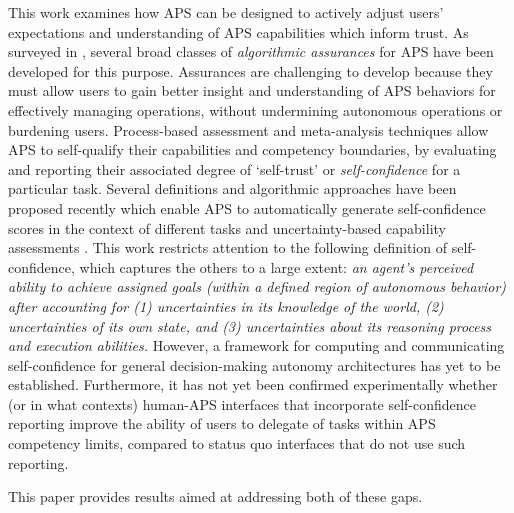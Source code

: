 This work examines how APS can be designed to actively adjust users' expectations and understanding of APS capabilities which inform trust. As surveyed in \cite{Israelsen2017-ym}, several broad classes of \emph{algorithmic assurances} for APS have been developed for this purpose. 
Assurances are challenging to develop because they must allow users to gain better insight and understanding of APS behaviors for effectively managing operations, without undermining autonomous operations or burdening users. 
Process-based assessment and meta-analysis techniques allow APS to self-qualify their capabilities and competency boundaries, by evaluating and reporting their associated degree of `self-trust' or \emph{self-confidence} for a particular task. 
Several definitions and algorithmic approaches have been proposed recently which enable APS to automatically generate self-confidence scores in the context of different tasks and uncertainty-based capability assessments \cite{Sweet2016-tz, Israelsen2017-ym}. This work restricts attention to the following definition of self-confidence, which captures the others to a large extent: \textit{an agent's perceived ability to achieve assigned goals (within a defined region of autonomous behavior) after accounting for (1) uncertainties in its knowledge of the world, (2) uncertainties of its own state, and (3) uncertainties about its reasoning process and execution abilities.}  However, a framework for computing and communicating self-confidence for general decision-making autonomy architectures has yet to be established. Furthermore, it has not yet been confirmed experimentally whether (or in what contexts) human-APS interfaces that incorporate self-confidence reporting improve the ability of users to delegate of tasks within APS competency limits, compared to status quo interfaces that do not use such reporting. 

This paper provides results aimed at addressing both of these gaps. 

